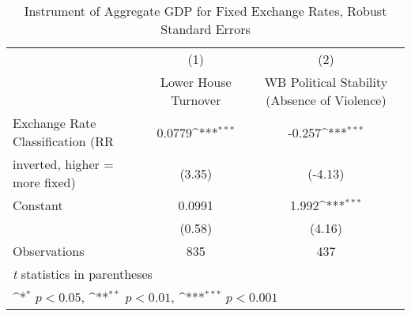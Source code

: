 \begin{table}[htbp]\centering
\def\sym#1{\ifmmode^{#1}\else\(^{#1}\)\fi}
\caption{Instrument of Aggregate GDP for Fixed Exchange Rates, Robust Standard Errors \label{miniRRIVs}}
\begin{tabular}{l*{2}{c}}
\toprule
                                        &\multicolumn{1}{c}{(1)}&\multicolumn{1}{c}{(2)}\\
                                        &\multicolumn{1}{c}{Lower House Turnover}&\multicolumn{1}{c}{WB Political Stability (Absence of Violence)}\\
\midrule
Exchange Rate Classification (RR        &   0.0779\sym{***}&   -0.257\sym{***}\\
inverted, higher = more fixed)          &   (3.35)         &  (-4.13)         \\
\addlinespace
Constant                                &   0.0991         &    1.992\sym{***}\\
                                        &   (0.58)         &   (4.16)         \\
\midrule
Observations                            &      835         &      437         \\
\bottomrule
\multicolumn{3}{l}{\footnotesize \textit{t} statistics in parentheses}\\
\multicolumn{3}{l}{\footnotesize \sym{*} \(p<0.05\), \sym{**} \(p<0.01\), \sym{***} \(p<0.001\)}\\
\end{tabular}
\end{table}
